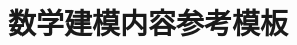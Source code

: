 \documentclass{xtan_cumcm}
\begin{document}



\title{数学建模内容参考模板}\author{}\date{}\maketitle\vspace{-5em}  









\newpage




\pagestyle{fancy}\fancyhead{}\fancyfoot[C]{\thepage}


















\end{document}
